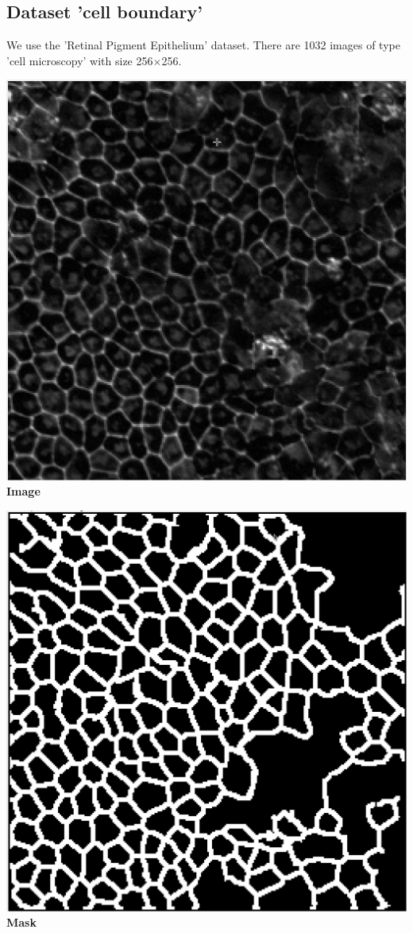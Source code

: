 \subsection{Dataset 'cell boundary'}

We use the 'Retinal Pigment Epithelium' dataset. There are 1032 images of type
'cell microscopy' with size 256$\times$256.

\medskip

\begin{minipage}[h!]{0.20\textwidth}
  \centering
  \includegraphics[scale=0.1]{./png/results/cell_image.png}
  \textbf{Image}
\end{minipage}\hfill
\begin{minipage}[h!]{0.20\textwidth}
  \centering
  \includegraphics[scale=0.1]{./png/results/cell_mask.png}
  \textbf{Mask}
\end{minipage}

